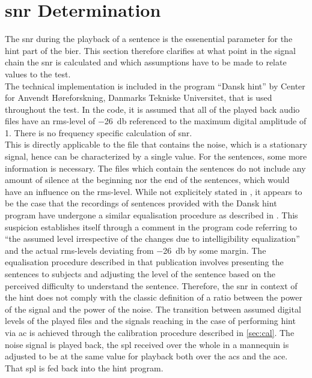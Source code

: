 \section{\gls{snr} Determination}\label{sec:snr_det}
The \gls{snr} during the playback of a sentence is the essenential parameter for the \gls{hint} part of the \gls{bier}.
This section therefore clarifies at what point in the signal chain the \gls{snr} is calculated and which assumptions have to be made to relate values to the test.\\
The technical implementation is included in the \matlab program \enquote{Dansk \gls{hint}} by Center for Anvendt Høreforskning, Danmarks Tekniske Universitet, that is used throughout the test.
In the code, it is assumed that all of the played back audio files have an \gls{rms}-level of \SI{-26}{\decibel} referenced to the maximum digital amplitude of 1. There is no frequency specific calculation of \gls{snr}.\\
This is directly applicable to the file that contains the noise, which is a stationary signal, hence can be characterized by a single value.
For the sentences, some more information is necessary. The files which contain the sentences do not include any amount of silence at the beginning nor the end of the sentences, which would have an influence on the \gls{rms}-level.
While not explicitely stated in \citep{hint_2011}, it appears to be the case that the recordings of sentences provided with the Dansk \gls{hint} program have undergone a similar equalisation procedure as described in \citep{nielsen_dau_09}. 
This suspicion establishes itself through a comment in the program code referring to \enquote{the assumed level irrespective of the changes due to intelligibility equalization} and the actual \gls{rms}-levels deviating from \SI{-26}{\decibel} by some margin.
The equalisation procedure described in that publication involves presenting the sentences to subjects and adjusting the level of the sentence based on the perceived difficulty to understand the sentence.
Therefore, the \gls{snr} in context of the \gls{hint} does not comply with the classic definition of a ratio between the power of the signal and the power of the noise.
The transition between assumed digital levels of the played files and the signals reaching in the case of performing \gls{hint} via \gls{ac} is achieved through the calibration procedure described in \autoref{sec:cal}. The noise signal is played back, the \gls{spl} received over the whole in a mannequin is adjusted  to be at the same value for playback both over the \gls{acs} and the \gls{ace}. That \gls{spl} is fed back into the \gls{hint} \matlab program.
